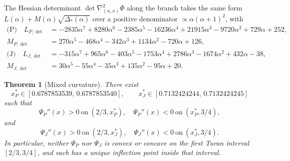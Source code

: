 \documentclass[11pt]{amsart}
\newtheorem{theorem}{Theorem}[section]
\theoremstyle{definition}
\begin{document}
The Hessian determinant $\det\nabla^2_{(\alpha,x)}\Phi$ along the branch takes
the same form $L(\alpha) + M(\alpha)\sqrt{\Delta_*(\alpha)}$ over a positive
denominator $\propto\alpha(\alpha+1)^2$, with
\begin{align*}
\text{(P)}\quad L_{P,\det} &= -2835\alpha^7+8280\alpha^6-2385\alpha^5-16236\alpha^4
+21915\alpha^3-9720\alpha^2+729\alpha+252,\\
            M_{P,\det} &= 270\alpha^5-468\alpha^4-342\alpha^3+1134\alpha^2-720\alpha+126,
\\
\text{(J)}\quad L_{J,\det} &= -315\alpha^7+965\alpha^6-403\alpha^5-1753\alpha^4
+2786\alpha^3-1674\alpha^2+432\alpha-38,\\
            M_{J,\det} &= 30\alpha^5-55\alpha^4-35\alpha^3+135\alpha^2-95\alpha+20.
\end{align*}

\begin{theorem}[Mixed curvature]
\label{thm:mixed-curvature}
There exist
\[
   x^*_P \in [0.6787853539,\,0.6787853540],
   \qquad
   x^*_J \in [0.7132424244,\,0.7132424245]
\]
such that
\[
   \Psi_P''(x) > 0\ \text{on}\ (2/3, x^*_P),\quad
   \Psi_P''(x) < 0\ \text{on}\ (x^*_P, 3/4),
\]
and
\[
   \Psi_J''(x) > 0\ \text{on}\ (2/3, x^*_J),\quad
   \Psi_J''(x) < 0\ \text{on}\ (x^*_J, 3/4).
\]
In particular, neither $\Psi_P$ nor $\Psi_J$ is convex or concave on the
first Turan interval $[2/3,3/4]$, and each has a unique inflection point
inside that interval.
\end{theorem}
\end{document}
